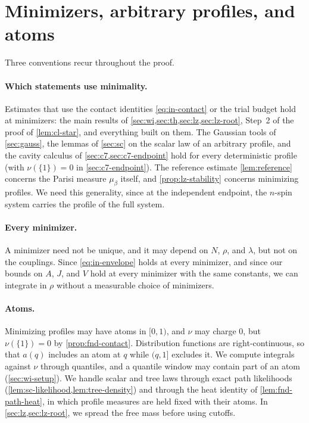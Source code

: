 \section{Minimizers, arbitrary profiles, and atoms}
\label{sec:overview-profiles}

Three conventions recur throughout the proof.

\paragraph{Which statements use minimality.}
Estimates that use the contact identities \eqref{eq:in-contact} or the
trial budget hold at minimizers: the main results of
\cref{sec:wi,sec:th,sec:lz,sec:lz-root}, Step~2 of the proof of
\cref{lem:cl-star}, and everything built on them. The Gaussian tools of
\cref{sec:gauss}, the lemmas of \cref{sec:sc} on the scalar law of an
arbitrary profile, and the cavity calculus of
\cref{sec:c7,sec:c7-endpoint} hold for every deterministic profile (with
$\nu(\{1\})=0$ in \cref{sec:c7-endpoint}). The reference estimate
\cref{lem:reference} concerns the Parisi measure $\mu_\beta$ itself, and
\cref{prop:lz-stability} concerns minimizing profiles. We need this generality,
since at the independent endpoint, the $n$-spin system carries the
profile of the full system.

\paragraph{Every minimizer.}
A minimizer need not be unique, and it may depend on $N$, $\rho$, and
$\lambda$, but not on the couplings. Since \eqref{eq:in-envelope} holds at
every minimizer, and since our bounds on $A$, $J$, and $V$ hold at every
minimizer with the same constants, we can integrate in $\rho$ without a
measurable choice of minimizers.

\paragraph{Atoms.}
Minimizing profiles may have atoms in $[0,1)$, and $\nu$ may charge
$0$, but $\nu(\{1\})=0$ by \cref{prop:fnd-contact}. Distribution functions are right-continuous, so that $a(q)$
includes an atom at $q$ while $(q,1]$ excludes it. We compute integrals
against $\nu$ through quantiles, and a quantile window may contain part
of an atom (\cref{sec:wi-setup}). We handle scalar and tree laws
through exact path likelihoods (\cref{lem:sc-likelihood,lem:tree-density})
and through the heat identity of \cref{lem:fnd-path-heat}, in which
profile measures are held fixed with their atoms. In
\cref{sec:lz,sec:lz-root}, we spread the free mass before using cutoffs.

